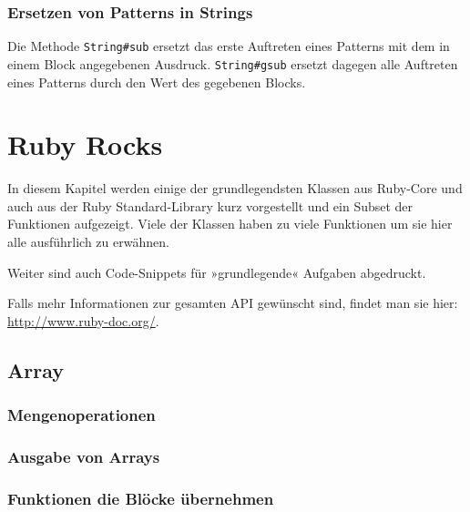\documentclass[a4book,11pt,twoside]{scrbook}
\begin{document}
\subsection*{Ersetzen von Patterns in Strings} %
\label{sub:ersetzen_von_patterns_in_strings}
Die Methode \texttt{String\#sub} ersetzt das erste Auftreten eines Patterns mit dem in einem Block angegebenen Ausdruck. \texttt{String\#gsub} ersetzt dagegen alle Auftreten eines Patterns durch den Wert des gegebenen Blocks.










\chapter{Ruby Rocks} %
\label{cha:ruby_types}
In diesem Kapitel werden einige der grundlegendsten Klassen aus Ruby-Core und auch aus der Ruby Standard-Library kurz vorgestellt und ein Subset der Funktionen aufgezeigt. Viele der Klassen haben zu viele Funktionen um sie hier alle ausführlich zu erwähnen.

Weiter sind auch Code-Snippets für »grundlegende« Aufgaben abgedruckt.

Falls mehr Informationen zur gesamten API gewünscht sind, findet man sie hier: \url{http://www.ruby-doc.org/}.



\section{Array} %
\label{sec:array}
\subsection{Mengenoperationen} %
\label{sub:mengenoperationen}


\subsection{Ausgabe von Arrays} %
\label{ssub:ausgabe_von_arrays}


\subsection{Funktionen die Blöcke übernehmen} %
\label{sub:funktionen_die_blöcke_übernehmen}

\end{document}
